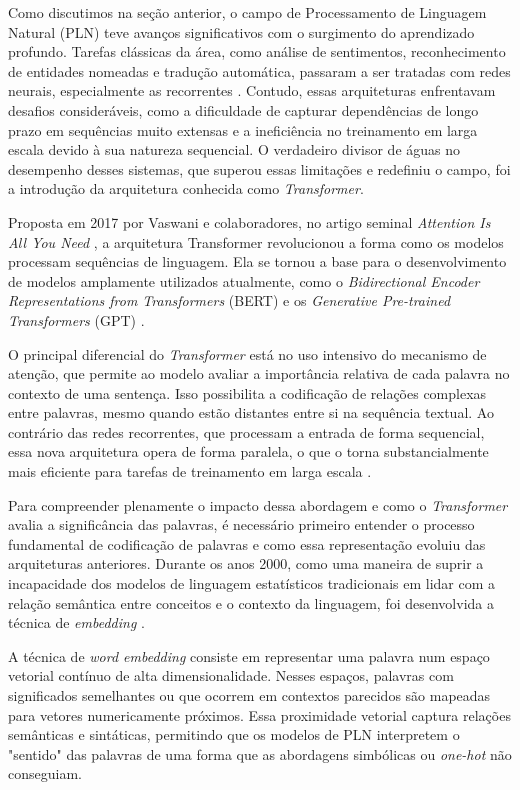 Como discutimos na seção anterior, o campo de Processamento de Linguagem Natural (PLN) teve avanços significativos com o surgimento do aprendizado profundo. Tarefas clássicas da área, como análise de sentimentos, reconhecimento de entidades nomeadas e tradução automática, passaram a ser tratadas com redes neurais, especialmente as recorrentes \cite{ansar_survey_2024}. Contudo, essas arquiteturas enfrentavam desafios consideráveis, como a dificuldade de capturar dependências de longo prazo em sequências muito extensas e a ineficiência no treinamento em larga escala devido à sua natureza sequencial. O verdadeiro divisor de águas no desempenho desses sistemas, que superou essas limitações e redefiniu o campo, foi a introdução da arquitetura conhecida como \textit{Transformer}.

Proposta em 2017 por Vaswani e colaboradores, no artigo seminal \textit{Attention Is All You Need} \cite{vaswani_attention_2017}, a arquitetura Transformer revolucionou a forma como os modelos processam sequências de linguagem. Ela se tornou a base para o desenvolvimento de modelos amplamente utilizados atualmente, como o \textit{Bidirectional Encoder Representations from Transformers} (BERT) e os \textit{Generative Pre-trained Transformers} (GPT) \cite{topal_exploring_2021}.

O principal diferencial do \textit{Transformer} está no uso intensivo do mecanismo de atenção, que permite ao modelo avaliar a importância relativa de cada palavra no contexto de uma sentença. Isso possibilita a codificação de relações complexas entre palavras, mesmo quando estão distantes entre si na sequência textual. Ao contrário das redes recorrentes, que processam a entrada de forma sequencial, essa nova arquitetura
opera de forma paralela, o que o torna substancialmente mais eficiente para tarefas de treinamento em larga escala \cite{vaswani_attention_2017}.

Para compreender plenamente o impacto dessa abordagem e como o \textit{Transformer} avalia a significância das palavras, é necessário primeiro entender o processo fundamental de codificação de palavras e como essa representação evoluiu das arquiteturas anteriores. Durante os anos 2000, como uma maneira de suprir a incapacidade dos modelos de linguagem estatísticos tradicionais em lidar com a relação semântica entre conceitos e o contexto da linguagem, foi desenvolvida a técnica de \textit{embedding} \cite{ansar_survey_2024}.

A técnica de \textit{word embedding} consiste em representar uma palavra num espaço vetorial contínuo de alta dimensionalidade. Nesses espaços, palavras com significados semelhantes ou que ocorrem em contextos parecidos são mapeadas para vetores numericamente próximos. Essa proximidade vetorial captura relações semânticas e sintáticas, permitindo que os modelos de PLN interpretem o "sentido" das palavras de uma forma que as abordagens simbólicas ou \textit{one-hot} não conseguiam.

